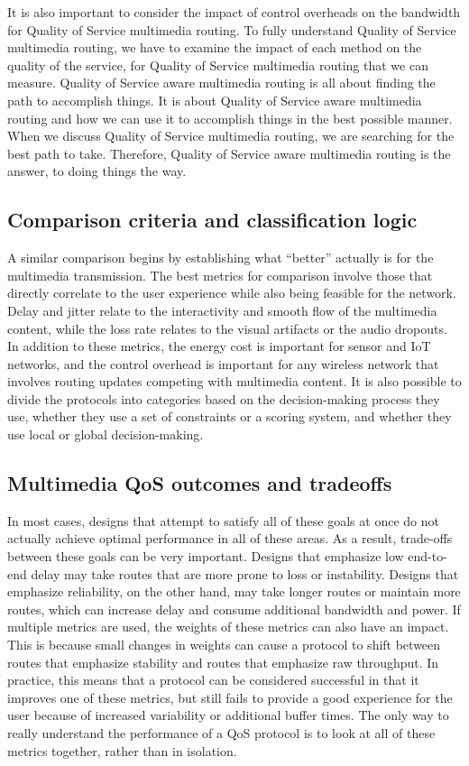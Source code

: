 \documentclass[12pt]{article}
\begin{document}
It is also important to consider the impact of control overheads on the bandwidth for Quality of Service multimedia routing. To fully understand Quality of Service multimedia routing, we have to examine the impact of each method on the quality of the service, for Quality of Service multimedia routing that we can measure. Quality of Service aware multimedia routing is all about finding the path to accomplish things. It is about Quality of Service aware multimedia routing and how we can use it to accomplish things in the best possible manner. When we discuss Quality of Service multimedia routing, we are searching for the best path to take. Therefore, Quality of Service aware multimedia routing is the answer, to doing things the way.
	\subsection{Comparison criteria and classification logic}
    A similar comparison \cite{chen2020analysis} begins by establishing what “better” actually is for the multimedia transmission. The best metrics for comparison involve those that directly correlate to the user experience while also being feasible for the network. Delay and jitter relate to the interactivity and smooth flow of the multimedia content, while the loss rate relates to the visual artifacts or the audio dropouts. In addition to these metrics, the energy cost is important for sensor and IoT networks, and the control overhead is important for any wireless network that involves routing updates competing with multimedia content. It is also possible to divide the protocols into categories based on the decision-making process they use, whether they use a set of constraints or a scoring system, and whether they use local or global decision-making.
        \subsection{Multimedia QoS outcomes and tradeoffs}
        In most cases, designs that attempt to satisfy all of these goals at once do not actually achieve optimal performance in all of these areas. As a result, trade-offs between these goals can be very important. Designs that emphasize low end-to-end delay may take routes that are more prone to loss or instability. Designs that emphasize reliability, on the other hand, may take longer routes or maintain more routes, which can increase delay and consume additional bandwidth and power. If multiple metrics are used, the weights of these metrics can also have an impact. This is because small changes in weights can cause a protocol to shift between routes that emphasize stability and routes that emphasize raw throughput. In practice, this means that a protocol can be considered successful in that it improves one of these metrics, but still fails to provide a good experience for the user because of increased variability or additional buffer times. The only way to really understand the performance of a QoS protocol is to look at all of these metrics together, rather than in isolation.
\end{document}
